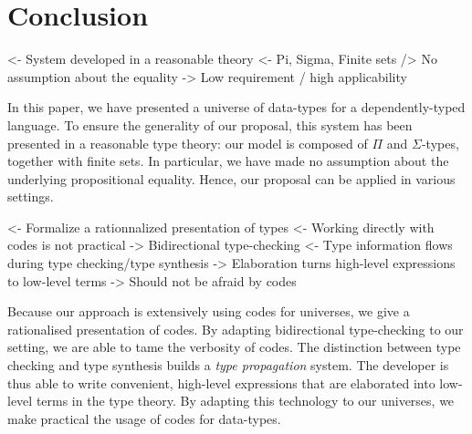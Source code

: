 \documentclass[preprint
              , authoryear
              ]{sigplanconf}
\newenvironment{wstructure}{\comment}{\endcomment}
\begin{document}












\section{Conclusion}

\begin{wstructure}
<- System developed in a reasonable theory
    <- Pi, Sigma, Finite sets
    /> No assumption about the equality
    -> Low requirement / high applicability
\end{wstructure}

In this paper, we have presented a universe of data-types for a
dependently-typed language. To ensure the generality of our proposal,
this system has been presented in a reasonable type theory: our model
is composed of $\Pi$ and $\Sigma$-types, together with finite sets. In
particular, we have made no assumption about the underlying
propositional equality. Hence, our proposal can be applied in various
settings.

\begin{wstructure}
<- Formalize a rationnalized presentation of types
    <- Working directly with codes is not practical
    -> Bidirectional type-checking
        <- Type information flows during type checking/type synthesis
        -> Elaboration turns high-level expressions to low-level terms
    -> Should not be afraid by codes
\end{wstructure}

Because our approach is extensively using codes for universes, we give
a rationalised presentation of codes. By adapting bidirectional
type-checking to our setting, we are able to tame the verbosity of
codes. The distinction between type checking and type synthesis builds
a \emph{type propagation} system. The developer is thus able to write
convenient, high-level expressions that are elaborated into low-level
terms in the type theory. By adapting this technology to our
universes, we make practical the usage of codes for data-types.
\end{document}
